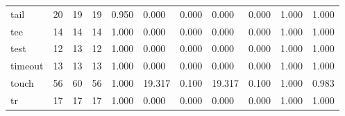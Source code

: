 \begin{longtable}{lp{1.2cm}p{1.2cm}p{1.2cm}p{1.2cm}p{1.2cm}p{1.2cm}p{1.2cm}p{1.2cm}p{1.2cm}p{1.2cm}}
tail      &                           20 &                 19 &                                19 &                                      0.950 &                                  0.000 &                                        0.000 &                             0.000 &                                   0.000 &                              1.000 &                                              1.000 \\
tee       &                           14 &                 14 &                                14 &                                      1.000 &                                  0.000 &                                        0.000 &                             0.000 &                                   0.000 &                              1.000 &                                              1.000 \\
test      &                           12 &                 13 &                                12 &                                      1.000 &                                  0.000 &                                        0.000 &                             0.000 &                                   0.000 &                              1.000 &                                              1.000 \\
timeout   &                           13 &                 13 &                                13 &                                      1.000 &                                  0.000 &                                        0.000 &                             0.000 &                                   0.000 &                              1.000 &                                              1.000 \\
touch     &                           56 &                 60 &                                56 &                                      1.000 &                                 19.317 &                                        0.100 &                            19.317 &                                   0.100 &                              1.000 &                                              0.983 \\
tr        &                           17 &                 17 &                                17 &                                      1.000 &                                  0.000 &                                        0.000 &                             0.000 &                                   0.000 &                              1.000 &                                              1.000 \\

\end{longtable}
